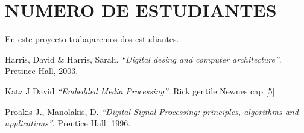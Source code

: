 \documentclass[10pt,graphicx,caption,rotating]{article}
\begin{document}
\section{NUMERO DE ESTUDIANTES}
\noindent
En este proyecto trabajaremos dos estudiantes.

\begin{thebibliography}{99}
 Harris, David \& Harris, Sarah.
{\em "`Digital desing and computer architecture"'}.
Pretince Hall, 2003.

 Katz J David
{\em "`Embedded Media Processing"'}.
Rick gentile Newnes cap [5]

 Proakis J., Manolakis, D.
{\em "`Digital Signal Processing: principles, algorithms and applications"'}.
Prentice Hall. 1996.
\end{thebibliography}
\end{document}
